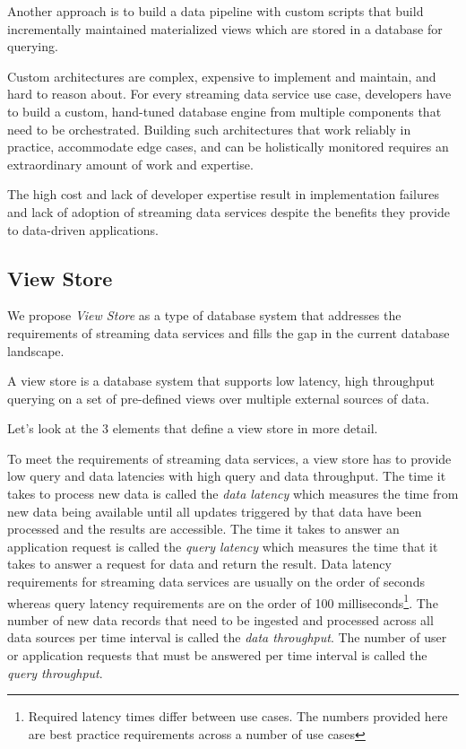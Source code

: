\documentclass[	DIV=calc,%
							paper=letter,%
							fontsize=11pt,%
							twocolumn]{scrartcl}	 					%
\begin{document}
Another approach is to build a data pipeline with custom scripts that build incrementally maintained materialized views which are stored in a database for querying.

Custom architectures are complex, expensive to implement and maintain, and hard to reason about. For every streaming data service use case, developers have to build a custom, hand-tuned database engine from multiple components that need to be orchestrated. Building such architectures that work reliably in practice, accommodate edge cases, and can be holistically monitored requires an extraordinary amount of work and expertise.

The high cost and lack of developer expertise result in implementation failures and lack of adoption of streaming data services despite the benefits they provide to data-driven applications.

\subsection{View Store}
\label{sec:viewstoredef}

We propose \emph{View Store} as a type of database system that addresses the requirements of streaming data services and fills the gap in the current database landscape.

A view store is a database system that supports low latency, high throughput querying on a set of pre-defined views over multiple external sources of data.

Let's look at the 3 elements that define a view store in more detail.

To meet the requirements of streaming data services, a view store has to provide low query and data latencies with high query and data throughput.
The time it takes to process new data is called the \emph{data latency} which measures the time from new data being available until all updates triggered by that data have been processed and the results are accessible. The time it takes to answer an application request is called the \emph{query latency} which measures the time that it takes to answer a request for data and return the result. Data latency requirements for streaming data services are usually on the order of seconds whereas query latency requirements are on the order of 100 milliseconds\footnote{Required latency times differ between use cases. The numbers provided here are best practice requirements across a number of use cases}.
The number of new data records that need to be ingested and processed across all data sources per time interval is called the \emph{data throughput}. The number of user or application requests that must be answered per time interval is called the \emph{query throughput}.
\end{document}
